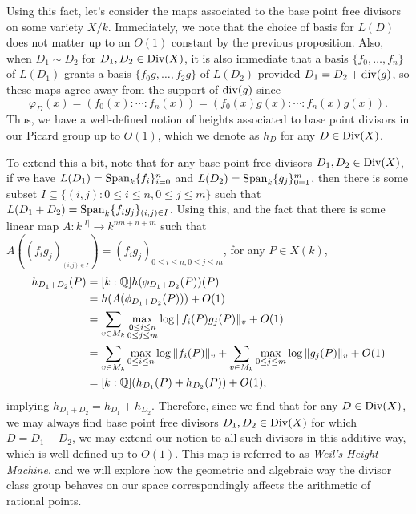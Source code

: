 Using this fact, let's consider the maps associated to the base point free divisors on some variety $X/k$.
Immediately, we note that the choice of basis for $L(D)$ does not matter up to an $O(1)$ constant by the previous proposition.
Also, when $D_1 \sim D_2$ for $D_1, D_2 \in {\rm Div}(X)$,
it is also immediate that a basis $\{f_0, \ldots, f_n\}$ of $L(D_1)$ grants a basis $\{f_0g, \ldots, f_2g\}$ of $L(D_2)$ provided $D_1 = D_2 + {\rm div}(g)$,
so these maps agree away from the support of ${\rm div}(g)$ since
\[
    \varphi_D(x) = (f_0(x) : \cdots : f_n(x)) = (f_0(x)g(x) : \cdots : f_n(x)g(x)).
\]
Thus, we have a well-defined notion of heights associated to base point divisors in our Picard group up to $O(1)$, 
which we denote as $h_D$ for any $D \in {\rm Div}(X)$.

To extend this a bit, note that for any base point free divisors $D_1, D_2 \in {\rm Div}(X)$,
if we have $L(D_1) = {\rm Span}_k\{f_i\}_{i = 0}^n$ and $L(D_2) = {\rm Span}_k\{g_j\}_{0 = 1}^m$,
then there is some subset $I \subseteq \{(i, j) : 0 \leq i \leq n, 0 \leq j \leq m\}$ such that $L(D_1 + D_2) = {\rm Span}_k\{f_ig_j\}_{(i, j) \in I}$.
Using this, and the fact that there is some linear map $A : k^{|I|} \to k^{nm + n + m}$ such that $A((f_ig_j)_{_{(i, j) \in I}}) = (f_ig_j)_{0 \leq i \leq n, 0 \leq j \leq m}$,
for any $P \in X(k)$,
\begin{align*}
    [k : \Q] h_{D_1 + D_2}(P)
    & = [k : \Q] h(\phi_{D_1 + D_2}(P))(P) \\
    & = h(A(\phi_{D_1 + D_2}(P))) + O(1) \\
    & = \sum_{v \in M_k} \max_{\substack{
        0 \leq i \leq n \\
        0 \leq j \leq m
    }} \log \|f_i(P) g_j(P)\|_v + O(1) \\
    & = \sum_{v \in M_k} \max_{0 \leq i \leq n} \log \|f_i(P)\|_v
        + \sum_{v \in M_k}  \max_{0 \leq j \leq m} \log \|g_j(P)\|_v
        + O(1) \\
    & = [k : \Q](h_{D_1}(P) + h_{D_2}(P)) + O(1),
\end{align*}
implying $h_{D_1 + D_2} = h_{D_1} + h_{D_2}$.
Therefore, since we find that for any $D \in {\rm Div}(X)$,
we may always find base point free divisors $D_1, D_2 \in {\rm Div}(X)$ for which $D = D_1 - D_2$,
we may extend our notion to all such divisors in this additive way,
which is well-defined up to $O(1)$.
This map is referred to as \textit{Weil's Height Machine},
and we will explore how the geometric and algebraic way the divisor class group behaves on our space correspondingly affects the arithmetic of rational points.

